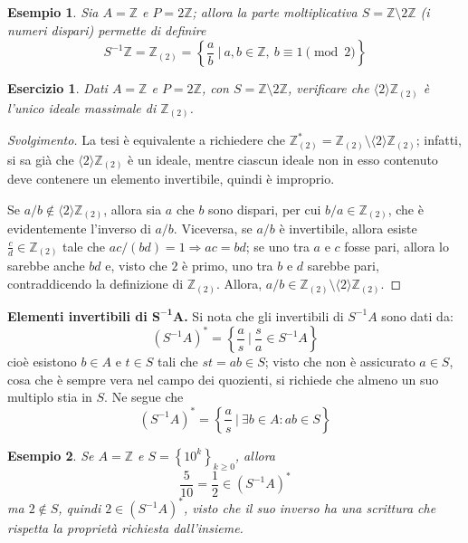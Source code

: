 \documentclass[11pt]{article}
\theoremstyle{style}
\newtheorem{esempio}{Esempio}[section]
\newtheorem{esercizio}{Esercizio}[section]
\newenvironment{svolgimento}{\renewcommand\qedsymbol{$\blacksquare$}\begin{proof}[Svolgimento]}{\end{proof}}
\numberwithin{equation}{subsection}
\renewcommand{\textbf}[1]{\textsf{\bfseries #1}}
\begin{document}
\begin{esempio}
Sia $A = \mathbb{Z}$ e $P = 2\mathbb{Z}$; allora la parte moltiplicativa $S = \mathbb{Z} \setminus 2\mathbb{Z}$ (i numeri dispari) permette di definire
\[
S^{-1}\mathbb{Z} = \mathbb{Z}_{(2)} = \left\{ \frac{a}{b} \ \bigg\lvert \ a, b\in \mathbb{Z}, \ b \equiv 1  \pmod{2}  \right\} 
\] 
\end{esempio}
\begin{esercizio}
	Dati $A = \mathbb{Z}$ e $P =2\mathbb{Z}$, con $S = \mathbb{Z} \setminus 2\mathbb{Z}$, verificare che $\langle 2 \rangle\mathbb{Z}_{(2)}$ \`e l'unico ideale massimale di $\mathbb{Z}_{(2)} $.
\end{esercizio}
	\begin{svolgimento}
		La tesi \`e equivalente a richiedere che $\mathbb{Z}_{(2)} ^* = \mathbb{Z}_{(2)} \setminus\langle 2 \rangle\mathbb{Z}_{(2)} $; infatti, si sa gi\`a che $\langle 2 \rangle\mathbb{Z}_{(2)} $ \`e un ideale, mentre ciascun ideale non in esso contenuto deve contenere un elemento invertibile, quindi \`e improprio.

		Se $a / b \not \in \langle 2 \rangle\mathbb{Z}_{(2)} $, allora sia $a$ che $b$ sono dispari, per cui $b/a \in \mathbb{Z}_{(2)} $, che \`e evidentemente l'inverso di $a / b$.
		Viceversa, se $a / b$ \`e invertibile, allora esiste $ \frac{c}{ d} \in \mathbb{Z}_(2)$ tale che $ac / (bd) =1 \Rightarrow ac = bd$; se uno tra $a$ e $c$ fosse pari, allora lo sarebbe anche $bd$ e, visto che $2$ \`e primo, uno tra $b$ e $d$ sarebbe pari, contraddicendo la definizione di $\mathbb{Z}_{(2)} $.
		Allora, $a / b \in \mathbb{Z}_{(2)} \setminus \langle 2 \rangle\mathbb{Z}_{(2)} $.
	\end{svolgimento}

\textbf{Elementi invertibili di $\mathbf{S^{-1}A} $.} 
Si nota che gli invertibili di $S^{-1}A$ sono dati da:
\[
	(S^{-1}A)^* = \left\{ \frac{a}{s} \ \bigg\lvert \ \frac{s}{a} \in S^{-1}A \right\} 
\] 
cio\`e esistono $b \in A$ e $t \in S$ tali che $st =  ab \in S$; visto che non \`e assicurato $a \in S$, cosa che \`e sempre vera nel campo dei quozienti, si richiede che almeno un suo multiplo stia in $S$.
Ne segue che 
\[
	(S^{-1}A) ^* = \left\{ \frac{a}{s} \ \bigg\lvert \ \exists b \in A : ab \in S \right\} 
\] 
\begin{esempio}
Se $A = \mathbb{Z}$ e $S = \left\{ 10^k \right\} _{k\ge 0} $, allora 
\[
\frac{5}{10}= \frac{1}{2}\in (S^{-1}A)^*
\] 
ma $2 \not \in S$, quindi $2 \in (S^{-1}A)^*$, visto che il suo inverso ha una scrittura che rispetta la propriet\`a richiesta dall'insieme.
\end{esempio}
\end{document}
